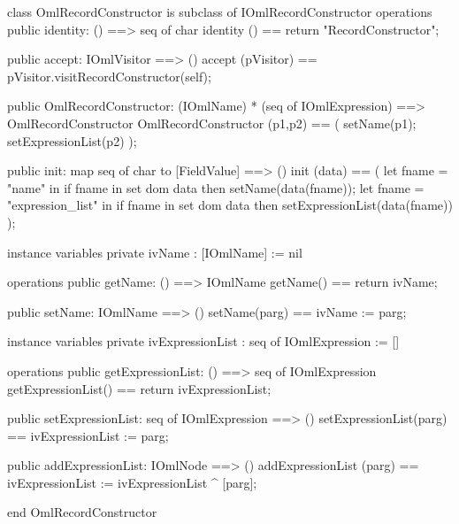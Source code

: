 \begin{vdm_al}
class OmlRecordConstructor is subclass of IOmlRecordConstructor
operations
  public identity: () ==> seq of char
  identity () == return "RecordConstructor";

  public accept: IOmlVisitor ==> ()
  accept (pVisitor) == pVisitor.visitRecordConstructor(self);

  public OmlRecordConstructor:
      (IOmlName) *
      (seq of IOmlExpression) ==> OmlRecordConstructor
  OmlRecordConstructor (p1,p2) == 
   ( setName(p1);
     setExpressionList(p2) );

  public init: map seq of char to [FieldValue] ==> ()
  init (data) ==
    ( let fname = "name" in
        if fname in set dom data
        then setName(data(fname));
      let fname = "expression_list" in
        if fname in set dom data
        then setExpressionList(data(fname)) );

instance variables
  private ivName : [IOmlName] := nil

operations
  public getName: () ==> IOmlName
  getName() == return ivName;

  public setName: IOmlName ==> ()
  setName(parg) == ivName := parg;

instance variables
  private ivExpressionList : seq of IOmlExpression := []

operations
  public getExpressionList: () ==> seq of IOmlExpression
  getExpressionList() == return ivExpressionList;

  public setExpressionList: seq of IOmlExpression ==> ()
  setExpressionList(parg) == ivExpressionList := parg;

  public addExpressionList: IOmlNode ==> ()
  addExpressionList (parg) == ivExpressionList := ivExpressionList ^ [parg];

end OmlRecordConstructor
\end{vdm_al}

